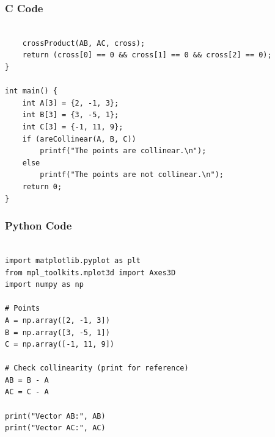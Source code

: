 \documentclass{beamer}
\begin{document}
\begin{frame}[fragile]
    \frametitle{C Code }
    \begin{lstlisting}

    crossProduct(AB, AC, cross);
    return (cross[0] == 0 && cross[1] == 0 && cross[2] == 0);
}

int main() {
    int A[3] = {2, -1, 3};
    int B[3] = {3, -5, 1};
    int C[3] = {-1, 11, 9};
    if (areCollinear(A, B, C))
        printf("The points are collinear.\n");
    else
        printf("The points are not collinear.\n");
    return 0;
}
    \end{lstlisting}
\end{frame}







\begin{frame}[fragile]
    \frametitle{Python Code}
    \begin{lstlisting}

import matplotlib.pyplot as plt
from mpl_toolkits.mplot3d import Axes3D
import numpy as np

# Points
A = np.array([2, -1, 3])
B = np.array([3, -5, 1])
C = np.array([-1, 11, 9])

# Check collinearity (print for reference)
AB = B - A
AC = C - A

print("Vector AB:", AB)
print("Vector AC:", AC)








    \end{lstlisting}
\end{frame}
\end{document}
